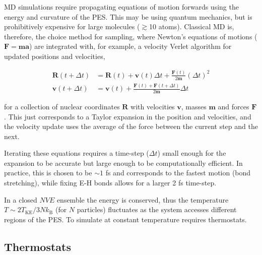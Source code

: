 \documentclass[main.tex]{subfiles}
\begin{document}
MD simulations require propagating equations of motion forwards using the energy and curvature of the PES. This may be using quantum mechanics, but is prohibitively expensive for large molecules ($\gtrsim$10 atoms).\cite{Zhang2016} Classical MD is, therefore, the choice method for sampling, where Newton's equations of motions ($\boldsymbol{F}=\boldsymbol{m}\boldsymbol{a}$) are integrated with, for example, a velocity Verlet algorithm for updated positions and velocities,


\begin{equation}
	\begin{aligned}
		\boldsymbol{R}(t+\Delta t) &= \boldsymbol{R}(t) + \boldsymbol{v}(t) \Delta t + \frac{\boldsymbol{F}(t) }{2 \boldsymbol{m}} (\Delta t)^2\\
		\boldsymbol{v}(t + \Delta t) &= \boldsymbol{v}(t)  + \frac{\boldsymbol{F}(t) + \boldsymbol{F}(t+\Delta t)}{2\boldsymbol{m}} \Delta t
	\end{aligned}
\end{equation}

for a collection of nuclear coordinates $\boldsymbol{R}$ with velocities $\boldsymbol{v}$, masses $\boldsymbol{m}$ and forces $\boldsymbol{F}$. This just corresponds to a Taylor expansion in the position and velocities, and the velocity update uses the average of the force between the current step and the next.

Iterating these equations requires a time-step ($\Delta t$) small enough for the expansion to be accurate but large enough to be computationally efficient. In practice, this is chosen to be $\sim 1$ fs and corresponds to the fastest motion (bond stretching), while fixing E-H bonds allows for a larger 2 fs time-step.\cite{Sweet2013}

In a closed $NVE$ ensemble the energy is conserved, thus the temperature $T \sim 2 T_\text{KE} / 3Nk_\text{B}$ (for $N$ particles) fluctuates as the system accesses different regions of the PES. To simulate at constant temperature  requires thermostats.

\subsection{Thermostats}
\end{document}
